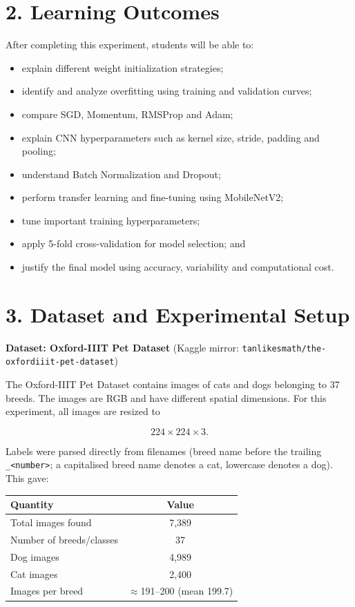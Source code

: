 \documentclass[10pt]{article}
\begin{document}
\section*{2. Learning Outcomes}

After completing this experiment, students will be able to:

\begin{itemize}
\item explain different weight initialization strategies;
\item identify and analyze overfitting using training and validation curves;
\item compare SGD, Momentum, RMSProp and Adam;
\item explain CNN hyperparameters such as kernel size, stride, padding and pooling;
\item understand Batch Normalization and Dropout;
\item perform transfer learning and fine-tuning using MobileNetV2;
\item tune important training hyperparameters;
\item apply 5-fold cross-validation for model selection; and
\item justify the final model using accuracy, variability and computational cost.
\end{itemize}

\section*{3. Dataset and Experimental Setup}

\textbf{Dataset: Oxford-IIIT Pet Dataset} (Kaggle mirror:
\texttt{tanlikesmath/the-oxfordiiit-pet-dataset})

The Oxford-IIIT Pet Dataset contains images of cats and dogs belonging
to 37 breeds. The images are RGB and have different spatial dimensions.
For this experiment, all images are resized to

\[
224\times224\times3.
\]

Labels were parsed directly from filenames (breed name before the
trailing \texttt{\_<number>}; a capitalised breed name denotes a cat,
lowercase denotes a dog). This gave:

\begin{center}
\begin{tabular}{|l|c|}
\hline
Quantity & Value\\
\hline
Total images found & 7{,}389\\
Number of breeds/classes & 37\\
Dog images & 4{,}989\\
Cat images & 2{,}400\\
Images per breed & $\approx$191--200 (mean 199.7)\\
\hline
\end{tabular}
\end{center}
\end{document}

